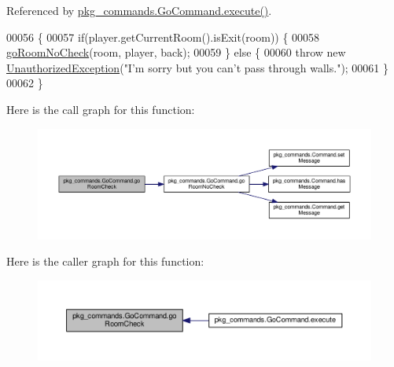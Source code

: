 Referenced by \hyperlink{GoCommand_8java_source_l00032}{pkg\-\_\-commands.\-Go\-Command.\-execute()}.


\begin{DoxyCode}
00056                                                                                                            
                                       \{
00057         \textcolor{keywordflow}{if}(player.getCurrentRoom().isExit(room)) \{
00058             \hyperlink{classpkg__commands_1_1GoCommand_a210afbc5f3ef34d3ad5759d853c8f8c2}{goRoomNoCheck}(room, player, back);
00059         \} \textcolor{keywordflow}{else} \{
00060             \textcolor{keywordflow}{throw} \textcolor{keyword}{new} \hyperlink{classpkg__exceptions_1_1UnauthorizedException}{UnauthorizedException}(\textcolor{stringliteral}{"I'm sorry but you can't pass through
       walls."});
00061         \}
00062     \}
\end{DoxyCode}


Here is the call graph for this function\-:\nopagebreak
\begin{figure}[H]
\begin{center}
\leavevmode
\includegraphics[width=350pt]{classpkg__commands_1_1GoCommand_acbf1aa81fa5b1aef7cafb8b4e3ace3a9_cgraph}
\end{center}
\end{figure}




Here is the caller graph for this function\-:\nopagebreak
\begin{figure}[H]
\begin{center}
\leavevmode
\includegraphics[width=350pt]{classpkg__commands_1_1GoCommand_acbf1aa81fa5b1aef7cafb8b4e3ace3a9_icgraph}
\end{center}
\end{figure}


